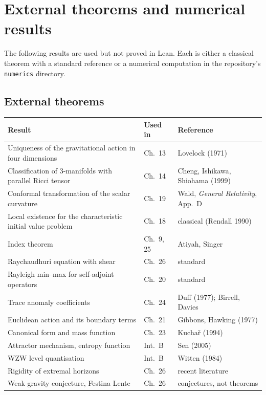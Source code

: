 \chapter{External theorems and numerical results}\label{app:C}

The following results are used but not proved in Lean. Each is either a classical theorem with a standard reference or a numerical computation in the repository's \texttt{numerics} directory.

\section*{External theorems}
\begin{longtable}{@{}p{}p{}p{}@{}}
\toprule Result & Used in & Reference\\\midrule\endhead
Uniqueness of the gravitational action in four dimensions & Ch.~13 & Lovelock (1971)\\
Classification of 3-manifolds with parallel Ricci tensor & Ch.~14 & Cheng, Ishikawa, Shiohama (1999)\\
Conformal transformation of the scalar curvature & Ch.~19 & Wald, \emph{General Relativity}, App.~D\\
Local existence for the characteristic initial value problem & Ch.~18 & classical (Rendall 1990)\\
Index theorem & Ch.~9, 25 & Atiyah, Singer\\
Raychaudhuri equation with shear & Ch.~26 & standard\\
Rayleigh min--max for self-adjoint operators & Ch.~20 & standard\\
Trace anomaly coefficients & Ch.~24 & Duff (1977); Birrell, Davies\\
Euclidean action and its boundary terms & Ch.~21 & Gibbons, Hawking (1977)\\
Canonical form and mass function & Ch.~23 & Kucha\v r (1994)\\
Attractor mechanism, entropy function & Int.~B & Sen (2005)\\
WZW level quantisation & Int.~B & Witten (1984)\\
Rigidity of extremal horizons & Ch.~26 & recent literature\\
Weak gravity conjecture, Festina Lente & Ch.~26 & conjectures, not theorems\\
\bottomrule
\end{longtable}

